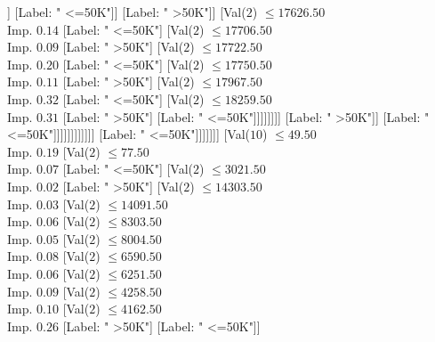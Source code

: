 \documentclass[margin=10pt]{standalone}
\begin{document}
\begin{forest}
																									[Val($2$) $ \leq 17236.50$ \\ Imp. $0.32$
																										[Val($2$) $ \leq 17228.50$ \\ Imp. $0.31$
																											[Label: " <=50K"]
																											[Label: " >50K"]]
																										[Label: " <=50K"]]
																									[Label: " >50K"]]
																								[Val($2$) $ \leq 17626.50$ \\ Imp. $0.14$
																									[Label: " <=50K"]
																									[Val($2$) $ \leq 17706.50$ \\ Imp. $0.09$
																										[Label: " >50K"]
																										[Val($2$) $ \leq 17722.50$ \\ Imp. $0.20$
																											[Label: " <=50K"]
																											[Val($2$) $ \leq 17750.50$ \\ Imp. $0.11$
																												[Label: " >50K"]
																												[Val($2$) $ \leq 17967.50$ \\ Imp. $0.32$
																													[Label: " <=50K"]
																													[Val($2$) $ \leq 18259.50$ \\ Imp. $0.31$
																														[Label: " >50K"]
																														[Label: " <=50K"]]]]]]]]
																							[Label: " >50K"]]
																						[Label: " <=50K"]]]]]]]]]]]]
											[Label: " <=50K"]]]]]]]
					[Val($10$) $ \leq 49.50$ \\ Imp. $0.19$
						[Val($2$) $ \leq 77.50$ \\ Imp. $0.07$
							[Label: " <=50K"]
							[Val($2$) $ \leq 3021.50$ \\ Imp. $0.02$
								[Label: " >50K"]
								[Val($2$) $ \leq 14303.50$ \\ Imp. $0.03$
									[Val($2$) $ \leq 14091.50$ \\ Imp. $0.06$
										[Val($2$) $ \leq 8303.50$ \\ Imp. $0.05$
											[Val($2$) $ \leq 8004.50$ \\ Imp. $0.08$
												[Val($2$) $ \leq 6590.50$ \\ Imp. $0.06$
													[Val($2$) $ \leq 6251.50$ \\ Imp. $0.09$
														[Val($2$) $ \leq 4258.50$ \\ Imp. $0.10$
															[Val($2$) $ \leq 4162.50$ \\ Imp. $0.26$
																[Label: " >50K"]
																[Label: " <=50K"]]

\end{forest}
\end{document}
